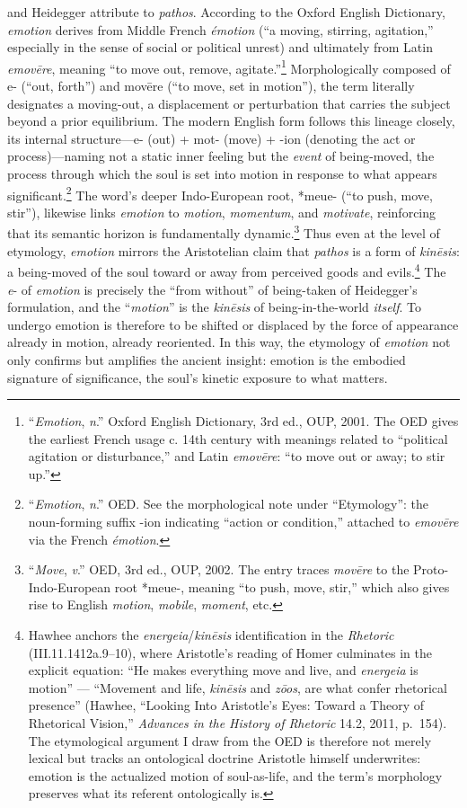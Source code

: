 \documentclass{article}
\begin{document}
and Heidegger attribute to \textit{pathos}. According to the Oxford English Dictionary, \textit{emotion} derives from Middle French \textit{émotion} (“a moving, stirring, agitation,” especially in the sense of social or political unrest) and ultimately from Latin \textit{emovēre}, meaning “to move out, remove, agitate.”\footnote{“\textit{Emotion}, \textit{n}.” Oxford English Dictionary, 3rd ed., OUP, 2001. The OED gives the earliest French usage c. 14th century with meanings related to “political agitation or disturbance,” and Latin \textit{emovēre}: “to move out or away; to stir up.”} Morphologically composed of e- (“out, forth”) and movēre (“to move, set in motion”), the term literally designates a moving-out, a displacement or perturbation that carries the subject beyond a prior equilibrium. The modern English form follows this lineage closely, its internal structure—e- (out) + mot- (move) + -ion (denoting the act or process)—naming not a static inner feeling but the \textit{event} of being-moved, the process through which the soul is set into motion in response to what appears significant.\footnote{“\textit{Emotion}, \textit{n}.” OED. See the morphological note under “Etymology”: the noun-forming suffix -ion indicating “action or condition,” attached to \textit{emovēre} via the French \textit{émotion}.} The word’s deeper Indo-European root, *meue- (“to push, move, stir”), likewise links \textit{emotion} to \textit{motion}, \textit{momentum}, and \textit{motivate}, reinforcing that its semantic horizon is fundamentally dynamic.\footnote{“\textit{Move}, \textit{v}.” OED, 3rd ed., OUP, 2002. The entry traces \textit{movēre} to the Proto-Indo-European root *meue-, meaning “to push, move, stir,” which also gives rise to English \textit{motion}, \textit{mobile}, \textit{moment}, etc.}  Thus even at the level of etymology, \textit{emotion} mirrors the Aristotelian claim that \textit{pathos} is a form of \textit{kinēsis}: a being-moved of the soul toward or away from perceived goods and evils.\footnote{Hawhee anchors the \textit{energeia}/\textit{kinēsis} identification in the \textit{Rhetoric} (III.11.1412a.9--10), where Aristotle's reading of Homer culminates in the explicit equation: ``He makes everything move and live, and \textit{energeia} is motion'' --- ``Movement and life, \textit{kinēsis} and \textit{zōos}, are what confer rhetorical presence'' (Hawhee, ``Looking Into Aristotle's Eyes: Toward a Theory of Rhetorical Vision,'' \textit{Advances in the History of Rhetoric} 14.2, 2011, p.~154). The etymological argument I draw from the OED is therefore not merely lexical but tracks an ontological doctrine Aristotle himself underwrites: emotion is the actualized motion of soul-as-life, and the term's morphology preserves what its referent ontologically is.} The \textit{e}- of \textit{emotion} is precisely the ``from without'' of being-taken of Heidegger's formulation, and the ``\textit{motion}'' is the \textit{kinēsis} of being-in-the-world \textit{itself}. To undergo emotion is therefore to be shifted or displaced by the force of appearance already in motion, already reoriented. In this way, the etymology of \textit{emotion} not only confirms but amplifies the ancient insight: emotion is the embodied signature of significance, the soul’s kinetic exposure to what matters. 
\end{document}
